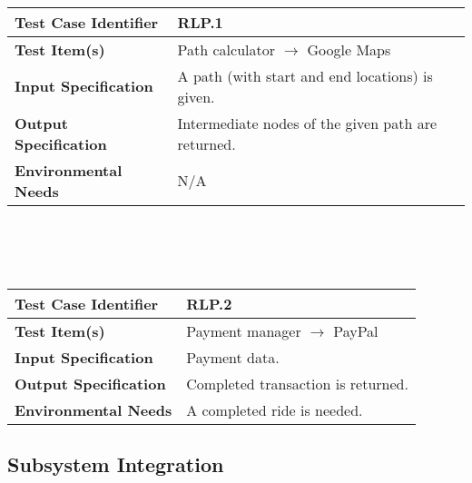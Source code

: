 {\begin{tabularx}{\textwidth}{l X}
\end{tabularx}
\\ \\ \\
\begin{tabularx}{\textwidth}{l X}
    \hline 
    \textbf{Test Case Identifier} & RLP.1\\ 
    \hline 
    
    \textbf{Test Item(s)} & Path calculator $\rightarrow$ Google Maps\\
    \hline 
    
    \textbf{Input Specification} & A path (with start and end locations) is given.\\
    \hline 
    
    \textbf{Output Specification} & Intermediate nodes of the given path are returned. \\
    \hline 
    
    \textbf{Environmental Needs} &  N/A \\
    \hline

\end{tabularx}
\\ \\ \\
\begin{tabularx}{\textwidth}{l X}
    \hline 
    \textbf{Test Case Identifier} & RLP.2\\ 
    \hline 
    
    \textbf{Test Item(s)} & Payment manager $\rightarrow$ PayPal\\
    \hline 
    
    \textbf{Input Specification} & Payment data. \\
    \hline 
    
    \textbf{Output Specification} & Completed transaction is returned. \\
    \hline 
    
    \textbf{Environmental Needs} & A completed ride is needed.  \\
    \hline

\end{tabularx}}

\subsection{Subsystem Integration}

